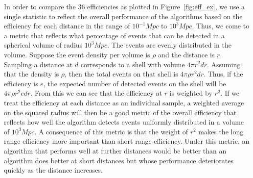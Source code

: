 \documentclass[twocolumn]{aastex62}
\begin{document}
In order to compare the 36 efficiencies as plotted in Figure~\ref{fig:eff_ex}, we use a single statistic to reflect the overall performance of the algorithms based on the efficiency for each distance in the range of $10^{-1} Mpc$ to $10^3 Mpc$. Thus, we come to a metric that reflects what percentage of events that can be detected in a spherical volume of radius $10^3 Mpc$. The events are evenly distributed in the volume. Suppose the event density per volume is $\rho$ and the distance is $r$. Sampling a distance at $d$ corresponds to a shell with volume $4 \pi r^2 dr$. Assuming that the density is $\rho$, then the total events on that shell is $4 \pi \rho r^2 dr$. Thus, if the efficiency is $e$, the expected number of detected events on the shell will be $4 \pi \rho r^2 e dr$. From this we can see that the efficiency at $r$ is weighted by $r^2$. If we treat the efficiency at each distance as an individual sample, a weighted average on the squared radius will then be a good metric of the overall efficiency that reflects how well the algorithm detects events uniformly distributed in a volume of $10^3 Mpc$. A consequence of this metric is that the weight of $r^2$ makes the long range efficiency more important than short range efficiency. Under this metric, an algorithm that performs well at further distances would be better than an algorithm does better at short distances but whose performance deteriorates quickly as the distance increases. 
\end{document}

